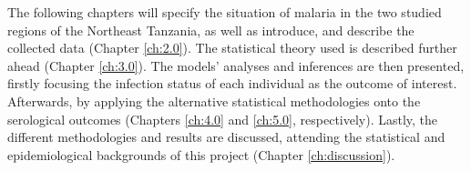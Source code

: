 The following chapters will specify the situation of malaria in the two studied regions of the Northeast Tanzania, as well as introduce, and describe the collected data (Chapter \ref{ch:2.0}).
The statistical theory used is described further ahead (Chapter \ref{ch:3.0}).
The models' analyses and inferences are then presented, firstly focusing the infection status of each individual as the outcome of interest.
Afterwards, by applying the alternative statistical methodologies onto the serological outcomes (Chapters \ref{ch:4.0} and \ref{ch:5.0}, respectively).
Lastly, the different methodologies and results are discussed, attending the statistical and epidemiological backgrounds of this project (Chapter \ref{ch:discussion}).